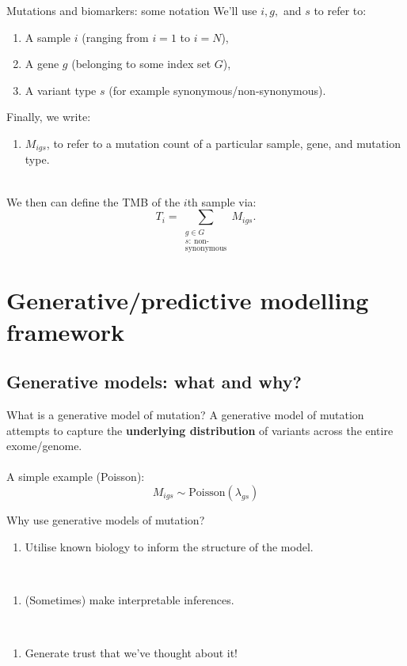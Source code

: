 \documentclass{beamer}
\begin{document}
\begin{frame}{Mutations and biomarkers: some notation}
We'll use $i,g,$ and $s$ to refer to:
\begin{enumerate}
    \item A sample $i$ (ranging from $i=1$ to $i=N$),
    \item A gene $g$ (belonging to some index set $G$),
    \item A variant type $s$ (for example synonymous/non-synonymous).
\end{enumerate}
Finally, we write:
\begin{enumerate}[4]  
    \item $M_{igs}$, to refer to a mutation count of a particular sample, gene, and mutation type.
\end{enumerate} 
~\\
We then can define the TMB of the $i$th sample via:
\[
T_i = \sum_{\substack{g \in G \\ s: \ \text{non-}\\ \text{synonymous}}} M_{igs}.
\]

\end{frame}

\section{Generative/predictive modelling framework}
\subsection{Generative models: what and why?}
\begin{frame}{What is a generative model of mutation?}
A generative model of mutation attempts to capture the \textbf{underlying distribution} of variants across the entire exome/genome. \\
~\\
A simple example (Poisson):
\begin{equation}
    M_{igs} \sim \mathrm{Poisson}(\lambda_{gs})
\end{equation}
\end{frame}

\begin{frame}{Why use generative models of mutation?}

\begin{enumerate}[I]
    \item Utilise known biology to inform the structure of the model.
\end{enumerate}
~\\
\begin{enumerate}[II]
    \item (Sometimes) make interpretable inferences.
\end{enumerate}
~\\
\begin{enumerate}[III]    
    \item Generate trust that we've thought about it!  
\end{enumerate}
\end{frame}
\end{document}
